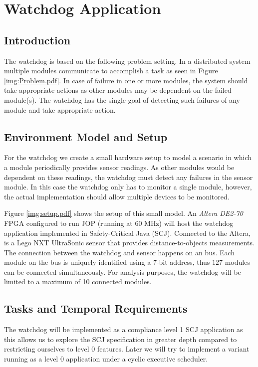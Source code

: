 \chapter{Watchdog Application}
\section{Introduction}
The watchdog is based on the following problem setting. In a distributed system multiple modules communicate to accomplish a task as seen in Figure \ref{img:Problem.pdf}. In case of failure in one or more modules, the system should take appropriate actions as other modules may be dependent on the failed module(s). The watchdog has the single goal of detecting such failures of any module and take appropriate action.


\section{Environment Model and Setup}
For the watchdog we create a small hardware setup to model a scenario in which a module periodically provides sensor readings. As other modules would be dependent on these readings, the watchdog must detect any failures in the sensor module. In this case the watchdog only has to monitor a single module, however, the actual implementation should allow multiple devices to be monitored.

Figure \ref{img:setup.pdf} shows the setup of this small model. An \textit{Altera DE2-70} FPGA configured to run JOP (running at 60 MHz) will host the watchdog application implemented in Safety-Critical Java (SCJ). Connected to the Altera, is a Lego NXT UltraSonic sensor that provides distance-to-objects measurements. The connection between the watchdog and sensor happens on an \iic bus. Each module on the bus is uniquely identified using a 7-bit address, thus $127$ modules can be connected simultaneously. For analysis purposes, the watchdog will be limited to a maximum of 10 connected modules.


\section{Tasks and Temporal Requirements}
The watchdog will be implemented as a compliance level 1 SCJ application as this allows us to explore the SCJ specification in greater depth compared to restricting ourselves to level 0 features. Later we will try to implement a variant running as a level 0 application under a cyclic executive scheduler.

